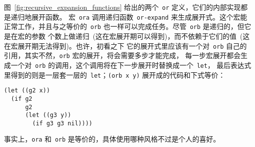图~\ref{fig:recursive_expansion_functions} 给出的两个~\texttt{or} 定义，它们的内部实现都是递归地展开函数。
宏~\texttt{ora} 调用递归函数~\texttt{or-expand} 来生成展开式。这个宏能
正常工作，并且与之等价的~\texttt{orb} 也一样可以完成任务。尽管~\texttt{orb} 是递归的，但它是在宏的参数
个数上做递归~(这在宏展开期可以得到)，而不依赖于它们的值~(这在宏展开期无法得到)。也许，初看之下
它的展开式里应该有一个对~\texttt{orb} 自己的引用，其实不然，\texttt{orb} 宏的展开，将会需要多步才能完成，
每一步宏展开都会生成一个对~\texttt{orb} 的调用，这个调用将在下一步展开时替换成一个~\texttt{let}，
最后表达式里得到的则是一层套一层的~\texttt{let}；\verb|(orb x y)| 展开成的代码和下式等价：
\begin{lstlisting}
(let ((g2 x))
  (if g2
      g2
      (let ((g3 y))
        (if g3 g3 nil))))
\end{lstlisting}
事实上，\texttt{ora} 和~\texttt{orb} 是等价的，具体使用哪种风格不过是个人的喜好。

